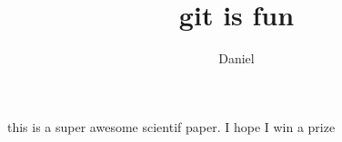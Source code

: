 \author{Daniel}
\title{git is fun}

	\maketitle

	this is a super awesome scientif paper.
	I hope I win a prize 


